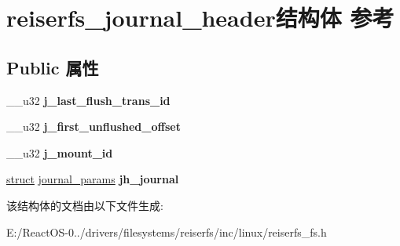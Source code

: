 \hypertarget{structreiserfs__journal__header}{}\section{reiserfs\+\_\+journal\+\_\+header结构体 参考}
\label{structreiserfs__journal__header}
\subsection*{Public 属性}
\begin{DoxyCompactItemize}
\item 
\mbox{\label{structreiserfs__journal__header_af1d8900e8deb6f806f6f5981101803a9}} 
\+\_\+\+\_\+u32 {\bfseries j\+\_\+last\+\_\+flush\+\_\+trans\+\_\+id}
\item 
\mbox{\label{structreiserfs__journal__header_a7e9e3b09e0b5a3c5d5dbf088f7bbbf7d}} 
\+\_\+\+\_\+u32 {\bfseries j\+\_\+first\+\_\+unflushed\+\_\+offset}
\item 
\mbox{\label{structreiserfs__journal__header_ad2ac972f9f8f0234f3b1c597b180a05b}} 
\+\_\+\+\_\+u32 {\bfseries j\+\_\+mount\+\_\+id}
\item 
\mbox{\label{structreiserfs__journal__header_a712eee6c2084c1c3ca5057410e7fceb7}} 
\hyperlink{interfacestruct}{struct} \hyperlink{structjournal__params}{journal\+\_\+params} {\bfseries jh\+\_\+journal}
\end{DoxyCompactItemize}


该结构体的文档由以下文件生成\+:\begin{DoxyCompactItemize}
\item 
E\+:/\+React\+O\+S-\/0../drivers/filesystems/reiserfs/inc/linux/reiserfs\+\_\+fs.\+h\end{DoxyCompactItemize}
